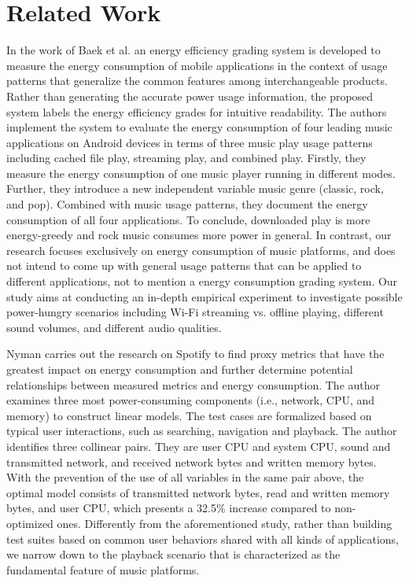 \section{Related Work}\label{sec:related}
In the work of Baek et al. \cite{baek2018energy} an energy efficiency grading system is developed to measure the energy consumption of mobile applications in the context of usage patterns that generalize the common features among interchangeable products. Rather than generating the accurate power usage information, the proposed system labels the energy efficiency grades for intuitive readability. The authors implement the system to evaluate the energy consumption of four leading music applications on Android devices in terms of three music play usage patterns including cached file play, streaming play, and combined play. Firstly, they measure the energy consumption of one music player running in different modes. Further, they introduce a new independent variable music genre (\ie classic, rock, and pop). Combined with music usage patterns, they document the energy consumption of all four applications. To conclude, downloaded play is more energy-greedy and rock music consumes more power in general. In contrast, our research focuses exclusively on energy consumption of music platforms, and does not intend to come up with general usage patterns that can be applied to different applications, not to mention a energy consumption grading system. Our study aims at conducting an in-depth empirical experiment to investigate possible power-hungry scenarios including Wi-Fi streaming vs. offline playing, {\color{blue} different sound volumes}, and different audio qualities. 

Nyman \cite{nyman2020estimating} carries out the research on Spotify to find proxy metrics that have the greatest impact on energy consumption and further determine potential relationships between measured metrics and energy consumption. The author examines three most power-consuming components (i.e., network, CPU, and memory) to construct linear models. The test cases are formalized based on typical user interactions, such as searching, navigation and playback. The author identifies three collinear pairs. They are user CPU and system CPU, sound and transmitted network, and received network bytes and written memory bytes. With the prevention of the use of all variables in the same pair above, the optimal model consists of transmitted network bytes, read and written memory bytes, and user CPU, which presents a 32.5\% increase compared to non-optimized ones. Differently from the aforementioned study, rather than building test suites based on common user behaviors shared with all kinds of applications, we narrow down to the playback scenario that is characterized as the fundamental feature of music platforms. 


